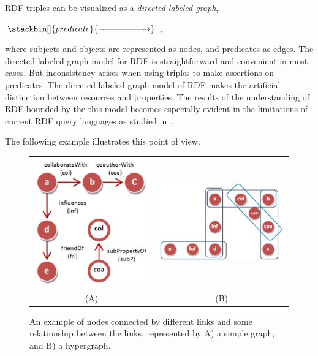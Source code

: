 RDF triples can be visualized as a \emph{directed labeled graph},
\begin{center}
 $\stackbin[]{predicate}{\xrightarrow{\hspace*{2cm}}}$ \;,\\
\end{center}
where subjects and objects are represented as nodes, and predicates as edges. The directed labeled graph model for RDF is straightforward and convenient in most cases. But inconsistency arises when using triples to make assertions on predicates. The directed labeled graph model of RDF makes the artificial distinction between resources and properties. The results of the understanding of RDF bounded by the this model becomes especially evident in the limitations of current RDF query languages as studied in~\cite{Angles04rdfquery}.

The following example illustrates this point of view.

\begin{figure}[tbh]
\begin{center}
\begin{tabular}{cc}
\includegraphics[width=.3\textwidth]{fig/reg_graph.eps} &
\includegraphics[width=.5\textwidth]{fig/hypergraph.eps}\\
(A) & (B)\\
\end{tabular}
\end{center}
\caption[An example of the simple graph compared to the hypergraph representation.]{\label{fig:graphcomp} An example of nodes connected by different links and some relationship between the links, represented by A) a simple graph, and B) a hypergraph.}
\end{figure}

